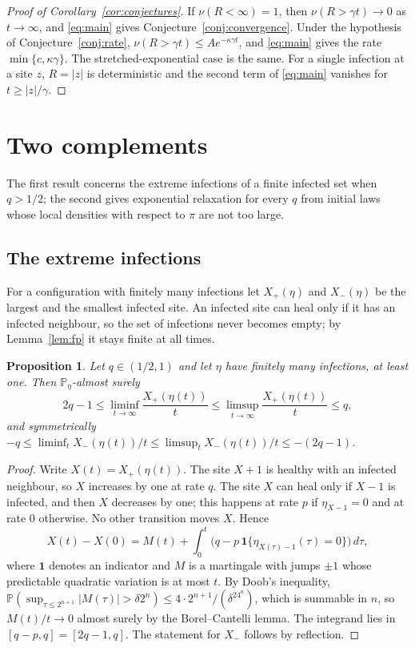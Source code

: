 \documentclass[11pt]{amsart}
\newtheorem{proposition}[theorem]{Proposition}
\theoremstyle{remark}
\newcommand{\PP}{\mathbb{P}}
\begin{document}
\begin{proof}[Proof of Corollary~\ref{cor:conjectures}]
If $\nu(R<\infty)=1$, then $\nu(R>\gamma t)\to0$ as $t\to\infty$, and \eqref{eq:main} gives
Conjecture~\ref{conj:convergence}. Under the hypothesis of Conjecture~\ref{conj:rate},
$\nu(R>\gamma t)\le Ae^{-\kappa\gamma t}$, and \eqref{eq:main} gives the rate $\min\{c,\kappa\gamma\}$. The
stretched-exponential case is the same. For a single infection at a site $z$, $R=|z|$ is deterministic and the
second term of \eqref{eq:main} vanishes for $t\ge|z|/\gamma$.
\end{proof}

\section{Two complements}\label{sec:further}

The first result concerns the extreme infections of a finite infected set when $q>1/2$; the second gives exponential
relaxation for every $q$ from initial laws whose local densities with respect to $\pi$ are not too large.

\subsection{The extreme infections}
For a configuration with finitely many infections let $X_+(\eta)$ and $X_-(\eta)$ be the largest and the smallest
infected site. An infected site can heal only if it has an infected neighbour, so the set of infections never becomes
empty; by Lemma~\ref{lem:fp} it stays finite at all times.

\begin{proposition}\label{prop:fronts}
Let $q\in(1/2,1)$ and let $\eta$ have finitely many infections, at least one. Then $\PP_\eta$-almost surely
\[
2q-1\le\liminf_{t\to\infty}\frac{X_+(\eta(t))}{t}\le\limsup_{t\to\infty}\frac{X_+(\eta(t))}{t}\le q,
\]
and symmetrically $-q\le\liminf_t X_-(\eta(t))/t\le\limsup_t X_-(\eta(t))/t\le-(2q-1)$.
\end{proposition}

\begin{proof}
Write $X(t)=X_+(\eta(t))$. The site $X+1$ is healthy with an infected neighbour, so $X$ increases by one at rate $q$.
The site $X$ can heal only if $X-1$ is infected, and then $X$ decreases by one; this happens at rate $p$ if
$\eta_{X-1}=0$ and at rate $0$ otherwise. No other transition moves $X$. Hence
\[
X(t)-X(0)=M(t)+\int_0^t\bigl(q-p\,\mathbf 1\{\eta_{X(\tau)-1}(\tau)=0\}\bigr)\,d\tau,
\]
where $\mathbf 1$ denotes an indicator and $M$ is a martingale with jumps $\pm1$ whose predictable quadratic variation is at most $t$. By Doob's
inequality, $\PP(\sup_{\tau\le2^{n+1}}|M(\tau)|>\delta2^n)\le4\cdot2^{n+1}/(\delta^24^n)$, which is summable in $n$, so
$M(t)/t\to0$ almost surely by the Borel--Cantelli lemma. The integrand lies in $[q-p,q]=[2q-1,q]$. The statement for
$X_-$ follows by reflection.
\end{proof}
\end{document}
